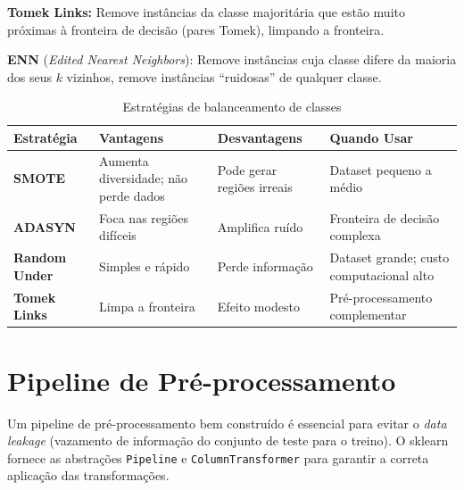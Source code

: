\documentclass[12pt,a4paper]{article}
\begin{document}
\textbf{Tomek Links:} Remove instâncias da classe majoritária que estão muito próximas à fronteira de decisão (pares Tomek), limpando a fronteira.

\textbf{ENN} (\textit{Edited Nearest Neighbors}): Remove instâncias cuja classe difere da maioria dos seus $k$ vizinhos, remove instâncias ``ruidosas'' de qualquer classe.

\begin{table}[ht]
\centering
\caption{Estratégias de balanceamento de classes}
\label{tab:balanceamento}
\small
\begin{tabular}{>{\bfseries}p{2.8cm} p{3.2cm} p{3.2cm} p{3.0cm}}
\toprule
\textbf{Estratégia} & \textbf{Vantagens} & \textbf{Desvantagens} & \textbf{Quando Usar} \\
\midrule
SMOTE & Aumenta diversidade; não perde dados & Pode gerar regiões irreais & Dataset pequeno a médio \\
\midrule
ADASYN & Foca nas regiões difíceis & Amplifica ruído & Fronteira de decisão complexa \\
\midrule
Random Under & Simples e rápido & Perde informação & Dataset grande; custo computacional alto \\
\midrule
Tomek Links & Limpa a fronteira & Efeito modesto & Pré-processamento complementar \\

\bottomrule
\end{tabular}
\end{table}

\section{Pipeline de Pré-processamento}

Um pipeline de pré-processamento bem construído é essencial para evitar o \textit{data leakage} (vazamento de informação do conjunto de teste para o treino). O sklearn fornece as abstrações \texttt{Pipeline} e \texttt{ColumnTransformer} para garantir a correta aplicação das transformações.
\end{document}
